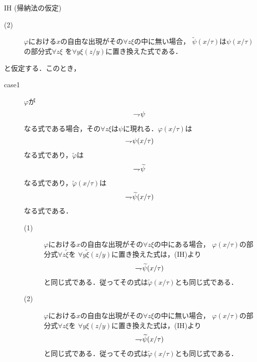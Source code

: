 \begin{metaprf}
\begin{description}
\begin{itembox}[l]{IH (帰納法の仮定)}
\begin{description}
						\item[(2)] $\varphi$における$x$の自由な出現がその$\forall z \xi$の中に無い場合，
							$\widetilde{\psi}(x/\tau)$は$\psi(x/\tau)$の部分式$\forall z \xi$ 
							を$\forall y \xi(z/y)$に置き換えた式である．
					\end{description}
				\end{itembox}
				と仮定する．このとき，
				\begin{description}
					\item[case1] $\varphi$が
						\begin{align}
							\rightharpoondown\hspace{-0.25em} \psi
						\end{align}
						なる式である場合，その$\forall z \xi$は$\psi$に現れる．$\varphi(x/\tau)$は
						\begin{align}
							\rightharpoondown\hspace{-0.25em} \psi(x/\tau)
						\end{align}
						なる式であり，$\widetilde{\varphi}$は
						\begin{align}
							\rightharpoondown\hspace{-0.25em} \widetilde{\psi}
						\end{align}
						なる式であり，$\widetilde{\varphi}(x/\tau)$は
						\begin{align}
							\rightharpoondown\hspace{-0.25em} \widetilde{\psi}(x/\tau)
						\end{align}
						なる式である．
						\begin{description}
							\item[(1)] $\varphi$における$x$の自由な出現がその$\forall z \xi$の中にある場合，
								$\varphi(x/\tau)$の部分式$\forall z \widetilde{\xi}$を
								$\forall y \widetilde{\xi}(z/y)$に置き換えた式は，(IH)より
								\begin{align}
									\rightharpoondown\hspace{-0.25em} \widetilde{\psi}(x/\tau)
								\end{align}
								と同じ式である．従ってその式は$\widetilde{\varphi}(x/\tau)$とも同じ式である．
								
							\item[(2)] $\varphi$における$x$の自由な出現がその$\forall z \xi$の中に無い場合，
								$\varphi(x/\tau)$の部分式$\forall z \xi$を
								$\forall y \xi(z/y)$に置き換えた式は，(IH)より
								\begin{align}
									\rightharpoondown\hspace{-0.25em} \widetilde{\psi}(x/\tau)
								\end{align}
								と同じ式である．従ってその式は$\widetilde{\varphi}(x/\tau)$とも同じ式である．
						\end{description}
						

\end{description}
\end{description}
\end{metaprf}
